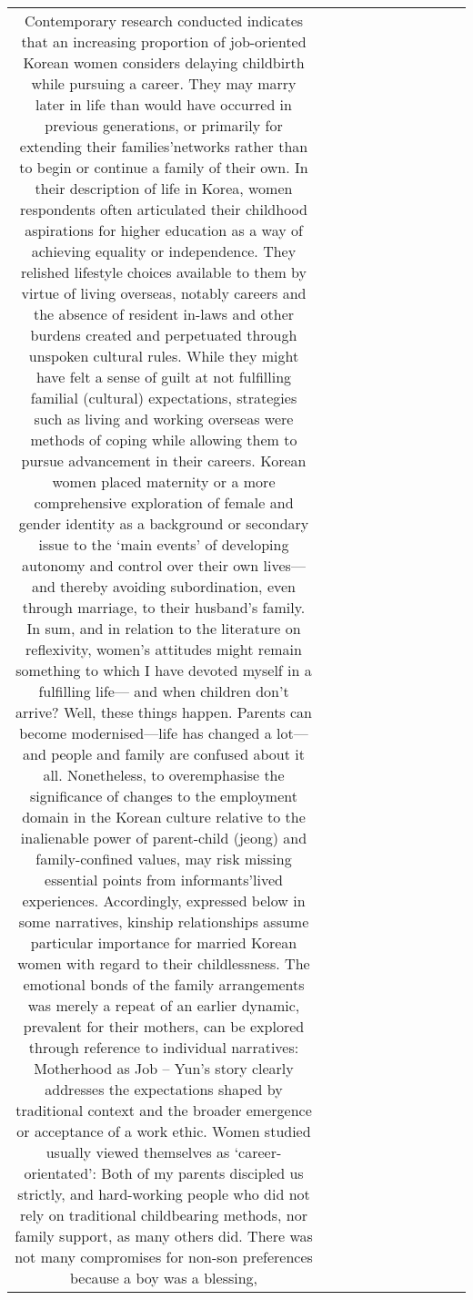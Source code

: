 \begin{table}[h!]
\begin{tabular}{|c|c|c|c|c|c|c|c|c|c|c|}
{Contemporary research conducted indicates that an increasing proportion of job-oriented Korean women considers delaying childbirth while pursuing a career. They may marry later in life than would have occurred in previous generations, or primarily for extending their families’networks rather than to begin or continue a family of their own.
In their description of life in Korea, women respondents often articulated their childhood aspirations for higher education as a way of achieving equality or independence. They relished lifestyle choices available to them by virtue of living overseas, notably careers and the absence of resident in-laws and other burdens created and perpetuated through unspoken cultural rules. While they might have felt a sense of guilt at not fulfilling familial (cultural) expectations, strategies such as living and working overseas were methods of coping while allowing them to pursue advancement in their careers. Korean women placed maternity or a more comprehensive exploration of female and gender identity as a background or secondary issue to the ‘main events’ of developing autonomy and control over their own lives—and thereby avoiding subordination, even through marriage, to their husband’s family. In sum, and in relation to the literature on reflexivity, women’s attitudes might remain something to which I have devoted myself in a fulfilling life— and when children don’t arrive? Well, these things happen. Parents can become modernised—life has changed a lot—and people and family are confused about it all.
Nonetheless, to overemphasise the significance of changes to the employment domain in the Korean culture relative to the inalienable power of parent-child (jeong) and family-confined values, may risk missing essential points from informants’lived experiences. Accordingly, expressed below in some narratives, kinship relationships assume particular importance for married Korean women with regard to their childlessness. The emotional bonds of the family arrangements was merely a repeat of an earlier dynamic, prevalent for their mothers, can be explored through reference to individual narratives:
Motherhood as Job --
Yun’s story clearly addresses the expectations shaped by traditional context and the broader emergence or acceptance of a work ethic. Women studied usually viewed themselves as ‘career-orientated’:
Both of my parents discipled us strictly, and hard-working people who did not rely
on traditional childbearing methods, nor family support, as many others did. There
was not many compromises for non-son preferences because a boy was a blessing,
}
\end{tabular}
\end{table}
